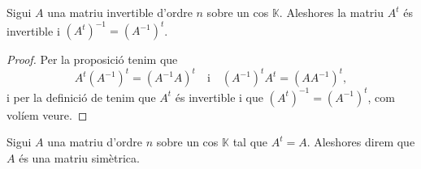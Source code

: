 \documentclass[../Apunts.tex]{subfiles}
\begin{document}
	\begin{proposition}
		\label{prop:transposada d'una invertible és invertible}
		Sigui \(A\) una matriu invertible d'ordre \(n\) sobre un cos \(\mathbb{K}\). Aleshores la matriu \(A^{t}\) és invertible i \(\left(A^{t}\right)^{-1}=\left(A^{-1}\right)^{t}\).
		\begin{proof}
			Per la proposició  tenim que
			\[A^{t}\left(A^{-1}\right)^{t}=\left(A^{-1}A\right)^{t}\quad\text{i}\quad \left(A^{-1}\right)^{t}A^{t}=\left(AA^{-1}\right)^{t},\]
			i per la definició de  tenim que \(A^{t}\) és invertible i que \(\left(A^{t}\right)^{-1}=\left(A^{-1}\right)^{t}\), com volíem veure.
		\end{proof}
	\end{proposition}
	\begin{definition}
		\label{def:matriu simètrica}
		Sigui \(A\) una matriu d'ordre \(n\) sobre un cos \(\mathbb{K}\) tal que \(A^{t}=A\). Aleshores direm que \(A\) és una matriu simètrica.
	\end{definition}
\end{document}
